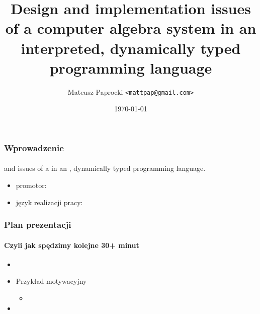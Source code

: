 \documentclass{beamer}
\title{
    Design and implementation issues \newline
    of a computer algebra system \newline
    in an interpreted, dynamically typed \newline
    programming language
}
\author{Mateusz Paprocki \texttt{<mattpap@gmail.com>}}
\institute[PWR]{Wrocław University of Technology}
\date{\today}
\begin{document}
\frame{\titlepage}

\begin{frame}
    \frametitle{Wprowadzenie}
    \framesubtitle{}

    \begin{center}
         and  issues \newline
        of a  \newline
        in an , dynamically typed \newline
        programming language.
    \end{center}

    \begin{itemize}
        \item promotor: 
        \item język realizacji pracy: 
    \end{itemize}
\end{frame}

\begin{frame}
    \frametitle{Plan prezentacji}
    \framesubtitle{Czyli jak spędzimy kolejne 30+ minut}

    \begin{itemize}
        \item
        \item Przykład motywacyjny
            \begin{itemize}
                \item
            \end{itemize}
        \item
    \end{itemize}
\end{frame}
\end{document}

